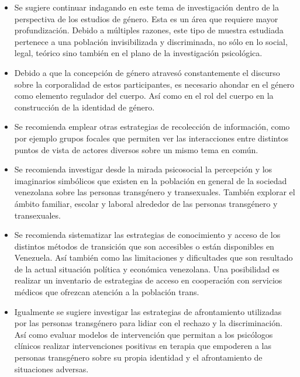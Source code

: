 \begin{itemize}

\item Se sugiere continuar indagando en este tema de
investigación dentro de la perspectiva de los estudios de género. Esta es un
área que requiere mayor profundización. Debido a múltiples razones, este tipo de
muestra estudiada pertenece a una población invisibilizada y discriminada, no
sólo en lo social, legal, teórico sino también en el plano de la investigación
psicológica.

\item Debido a que la concepción de género atravesó constantemente el discurso
sobre la corporalidad de estos participantes, es necesario ahondar en el género
como elemento regulador del cuerpo. Así como en el rol del cuerpo en la
construcción de la identidad de género.

\item Se recomienda emplear otras estrategias de recolección de información,
como por ejemplo grupos focales que permiten ver las interacciones entre
distintos puntos de vista de actores diversos sobre un mismo tema en común.

\item Se recomienda investigar desde la mirada psicosocial la percepción y los
imaginarios simbólicos que existen en la población en general de la sociedad
venezolana sobre las personas transgénero y transexuales. También explorar el
ámbito familiar, escolar y laboral alrededor de las personas transgénero y
transexuales.

\item Se recomienda sistematizar las estrategias de conocimiento y acceso de los
distintos métodos de transición que son accesibles o están disponibles en
Venezuela. Así también como las limitaciones y dificultades que son resultado de
la actual situación política y económica venezolana. Una posibilidad es realizar
un inventario de estrategias de acceso en cooperación con servicios médicos que
ofrezcan atención a la población trans.

\item Igualmente se sugiere investigar las estrategias de afrontamiento
utilizadas por las personas transgénero para lidiar con el rechazo y la
discriminación. Así como evaluar modelos de intervención que permitan a los
psicólogos clínicos realizar intervenciones positivas en terapia que empoderen a
las personas transgénero sobre su propia identidad y el afrontamiento de
situaciones adversas.


\end{itemize}
